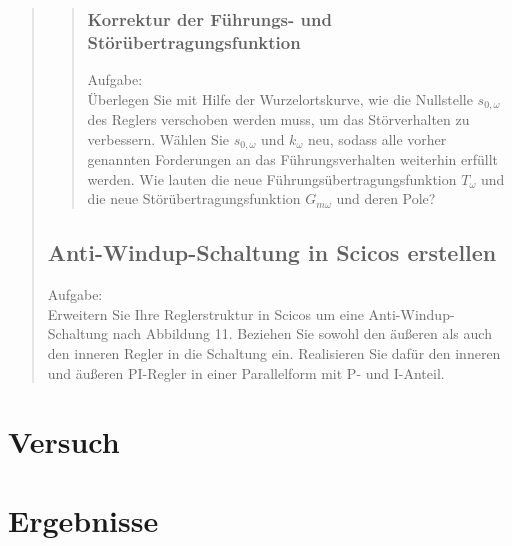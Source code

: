 \begin{quote}
\begin{quote}
		\subsubsection{Korrektur der Führungs- und Störübertragungsfunktion}
		Aufgabe:\\
	    Überlegen Sie mit Hilfe der Wurzelortskurve, wie die Nullstelle $s_{0,ω}$ des Reglers verschoben werden muss, um
	    das Störverhalten zu verbessern. Wählen Sie $s_{0,ω}$ und $k_\omega$ neu, sodass alle vorher genannten
	    Forderungen an das Führungsverhalten weiterhin erfüllt werden. Wie lauten die neue
	    Führungsübertragungsfunktion $T_\omega$ und die neue Störübertragungsfunktion $G_{m\omega}$ und deren Pole?
		\begin{quote}
			
		\end{quote}
		
	\end{quote}
	
	\subsection{Anti-Windup-Schaltung in Scicos erstellen}
	Aufgabe:\\
    Erweitern Sie Ihre Reglerstruktur in Scicos um eine Anti-Windup-Schaltung nach Abbildung 11. Beziehen Sie sowohl
    den äußeren als auch den inneren Regler in die Schaltung ein. Realisieren Sie dafür den inneren und äußeren
    PI-Regler in einer Parallelform mit P- und I-Anteil.
	\begin{quote}
		
		
	\end{quote}
	
\end{quote}


\section{Versuch}
\begin{quote}
    
\end{quote}


\section{Ergebnisse}
\begin{quote}
    
\end{quote}

